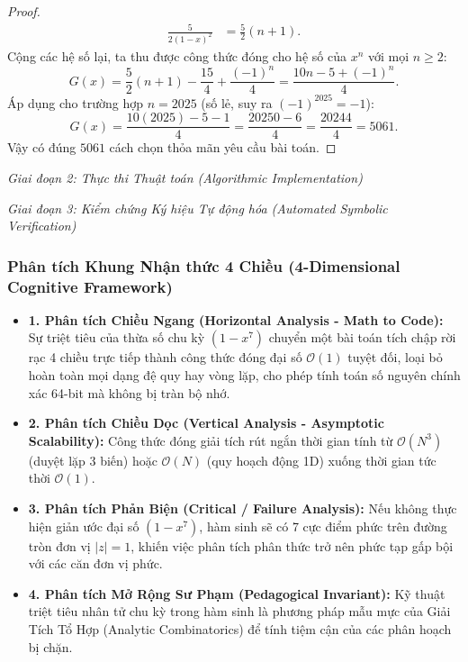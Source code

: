 \documentclass{article}
\begin{document}
\begin{proof}
\begin{align}
    [x^n] \frac{5}{2(1 - x)^2} &= \frac{5}{2}(n + 1).
\end{align}
Cộng các hệ số lại, ta thu được công thức đóng cho hệ số của $x^n$ với mọi $n \ge 2$:
\begin{equation}
    [x^n] G(x) = \frac{5}{2}(n + 1) - \frac{15}{4} + \frac{(-1)^n}{4} = \frac{10n - 5 + (-1)^n}{4}.
\end{equation}
Áp dụng cho trường hợp $n = 2025$ (số lẻ, suy ra $(-1)^{2025} = -1$):
\begin{equation}
    [x^{2025}] G(x) = \frac{10(2025) - 5 - 1}{4} = \frac{20250 - 6}{4} = \frac{20244}{4} = 5061.
\end{equation}
Vậy có đúng $5061$ cách chọn thỏa mãn yêu cầu bài toán.
\end{proof}

\vspace{0.5em}\noindent\emph{Giai đoạn 2: Thực thi Thuật toán (Algorithmic Implementation)}


\vspace{0.5em}\noindent\emph{Giai đoạn 3: Kiểm chứng Ký hiệu Tự động hóa (Automated Symbolic Verification)}


\subsubsection*{Phân tích Khung Nhận thức 4 Chiều (4-Dimensional Cognitive Framework)}
\begin{itemize}
    \item \textbf{1. Phân tích Chiều Ngang (Horizontal Analysis - Math to Code):} Sự triệt tiêu của thừa số chu kỳ $(1 - x^7)$ chuyển một bài toán tích chập rời rạc 4 chiều trực tiếp thành công thức đóng đại số $\mathcal{O}(1)$ tuyệt đối, loại bỏ hoàn toàn mọi dạng đệ quy hay vòng lặp, cho phép tính toán số nguyên chính xác 64-bit mà không bị tràn bộ nhớ.
    \item \textbf{2. Phân tích Chiều Dọc (Vertical Analysis - Asymptotic Scalability):} Công thức đóng giải tích rút ngắn thời gian tính từ $\mathcal{O}(N^3)$ (duyệt lặp 3 biến) hoặc $\mathcal{O}(N)$ (quy hoạch động 1D) xuống thời gian tức thời $\mathcal{O}(1)$.
    \item \textbf{3. Phân tích Phản Biện (Critical / Failure Analysis):} Nếu không thực hiện giản ước đại số $(1 - x^7)$, hàm sinh sẽ có 7 cực điểm phức trên đường tròn đơn vị $|z| = 1$, khiến việc phân tích phân thức trở nên phức tạp gấp bội với các căn đơn vị phức.
    \item \textbf{4. Phân tích Mở Rộng Sư Phạm (Pedagogical Invariant):} Kỹ thuật triệt tiêu nhân tử chu kỳ trong hàm sinh là phương pháp mẫu mực của Giải Tích Tổ Hợp (Analytic Combinatorics) để tính tiệm cận của các phân hoạch bị chặn.
\end{itemize}
\end{document}
